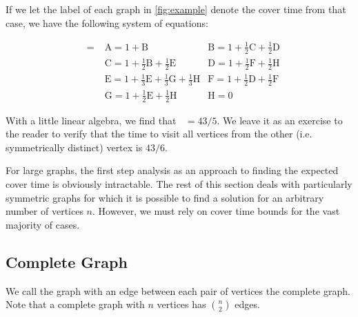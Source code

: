 \documentclass[12pt]{article}
\theoremstyle{definition}
\DeclareMathOperator{\tcov}{t_\textrm{cov}}      %
\begin{document}
If we let the label of each graph in \cref{fig:example}
denote the cover time from that case, we have the following system
of equations:

\begin{align}
\tcov = &\textrm{A} = 1 + \textrm{B}
&\textrm{B} = 1 + \frac{1}{2}\textrm{C} + \frac{1}{2}\textrm{D} \nonumber \\
&\textrm{C} = 1 + \frac{1}{2}\textrm{B} + \frac{1}{2}\textrm{E}
&\textrm{D} = 1 + \frac{1}{2}\textrm{F} + \frac{1}{2}\textrm{H} \nonumber \\
&\textrm{E} = 1 + \frac{1}{3}\textrm{E} + \frac{1}{3}\textrm{G} + \frac{1}{3}\textrm{H}
&\textrm{F} = 1 + \frac{1}{2}\textrm{D} + \frac{1}{2}\textrm{F} \nonumber \\
&\textrm{G} = 1 + \frac{1}{2}\textrm{E} + \frac{1}{2}\textrm{H}
&\textrm{H} = 0\nonumber
\end{align}

With a little linear algebra, we find that $\tcov = 43/5$.
We leave it as an exercise to the reader to verify that the time
to visit all vertices from the other (i.e. symmetrically distinct) vertex is $43/6$.

For large graphs, the first step analysis as an approach to finding the expected
cover time is obviously intractable.
The rest of this section deals with particularly symmetric graphs
for which it is possible to find a solution for an arbitrary number of vertices $n$.
However, we must rely on cover time bounds for the vast majority of cases.

\subsection{Complete Graph}\label{sec:complete}
We call the graph with an edge between each pair of vertices the
complete graph.
Note that a complete graph with $n$ vertices has ${n \choose 2}$ edges.
\end{document}
